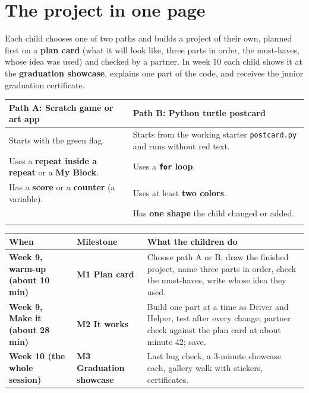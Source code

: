 \documentclass[track=junior,level=3,teacher]{kidscode}
\begin{document}
\tableofcontents

\section{The project in one page}
Each child chooses one of two paths and builds a project of their own, planned first on a
\textbf{plan card} (what it will look like, three parts in order, the must-haves, whose idea was
used) and checked by a partner. In week 10 each child shows it at the \textbf{graduation showcase},
explains one part of the code, and receives the junior graduation certificate.

\begin{center}\small\renewcommand{\arraystretch}{1.35}
\begin{tabularx}{\linewidth}{@{}>{\RaggedRight}X>{\RaggedRight\arraybackslash}X@{}}
\toprule
\textbf{Path A: Scratch game or art app} & \textbf{Path B: Python turtle postcard}\\
\midrule
Starts with the green flag. & Starts from the working starter \texttt{postcard.py} and runs without red text.\\
Uses a \textbf{repeat inside a repeat} or a \textbf{My Block}. & Uses a \textbf{\texttt{for} loop}.\\
Has a \textbf{score} or a \textbf{counter} (a variable). & Uses at least \textbf{two colors}.\\
 & Has \textbf{one shape} the child changed or added.\\
\midrule
\multicolumn{2}{@{}l@{}}{Both paths: planned on the plan card and checked by a partner against it.}\\
\bottomrule
\end{tabularx}
\end{center}

\begin{center}\small\renewcommand{\arraystretch}{1.35}
\begin{tabularx}{\linewidth}{@{}>{\bfseries\RaggedRight}p{3.0cm}>{\bfseries\RaggedRight}p{3.2cm}X@{}}
\toprule
When & Milestone & What the children do\\
\midrule
Week 9, warm-up (about 10 min) & M1 Plan card & Choose path A or B, draw the finished project, name three parts in order, check the must-haves, write whose idea they used.\\
Week 9, Make it (about 28 min) & M2 It works & Build one part at a time as Driver and Helper, test after every change; partner check against the plan card at about minute 42; save.\\
Week 10 (the whole session) & M3 Graduation showcase & Last bug check, a 3-minute showcase each, gallery walk with stickers, certificates.\\
\bottomrule
\end{tabularx}
\end{center}
\end{document}
